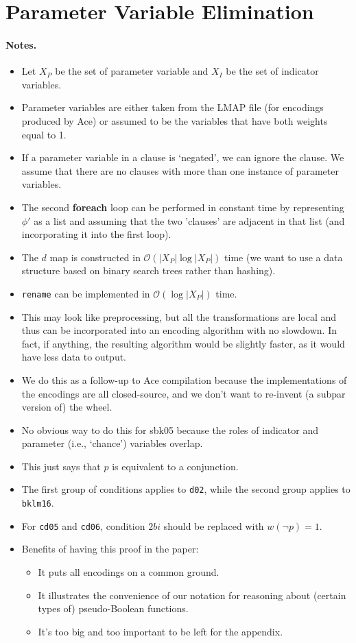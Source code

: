 \documentclass[runningheads]{llncs}
\begin{document}
\section{Parameter Variable Elimination}

\paragraph{Notes.}
\begin{itemize}
\item Let $X_P$ be the set of parameter variable and $X_I$ be the set of
  indicator variables.
\item Parameter variables are either taken from the LMAP file (for encodings
  produced by Ace) or assumed to be the variables that have both weights equal
  to 1.
\item If a parameter variable in a clause is `negated', we can ignore the
  clause. We assume that there are no clauses with more than one instance of
  parameter variables.
\item The second \textbf{foreach} loop can be performed in constant time by
  representing $\phi'$ as a list and assuming that the two 'clauses' are
  adjacent in that list (and incorporating it into the first loop).
\item The $d$ map is constructed in $\mathcal{O}(|X_P|\log|X_P|)$ time (we want
  to use a data structure based on binary search trees rather than hashing).
\item \texttt{rename} can be implemented in $\mathcal{O}(\log |X_P|)$ time.
\item This may look like preprocessing, but all the transformations are local
  and thus can be incorporated into an encoding algorithm with no slowdown. In
  fact, if anything, the resulting algorithm would be slightly faster, as it
  would have less data to output.
\item We do this as a follow-up to Ace compilation because the implementations
  of the encodings are all closed-source, and we don't want to re-invent (a
  subpar version of) the wheel.
\item No obvious way to do this for sbk05 because the roles of indicator and
  parameter (i.e., `chance') variables overlap.
\item This just says that $p$ is equivalent to a conjunction.
\item The first group of conditions applies to \texttt{d02}, while the second
  group applies to \texttt{bklm16}.
\item For \texttt{cd05} and \texttt{cd06}, condition $2bi$ should be replaced
  with $w(\neg p) = 1$.
\item Benefits of having this proof in the paper:
  \begin{itemize}
  \item It puts all encodings on a common ground.
  \item It illustrates the convenience of our notation for reasoning about
    (certain types of) pseudo-Boolean functions.
  \item It's too big and too important to be left for the appendix.
  \end{itemize}
\end{itemize}
\end{document}
